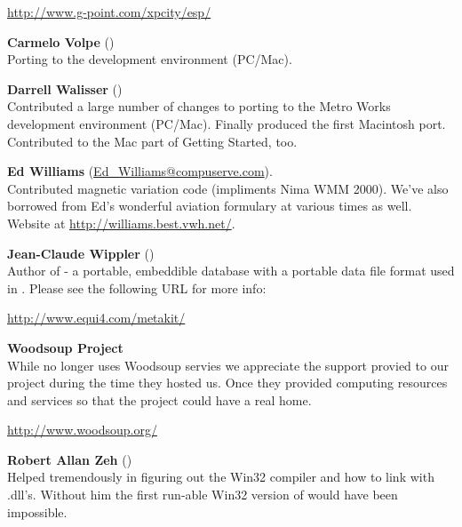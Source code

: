   \href{http://www.g-point.com/xpcity/esp/}{http://www.g-point.com/xpcity/esp/}
\medskip


\noindent \textbf{Carmelo Volpe}
()\\
  Porting \FlightGear{} to the  development environment
  (PC/Mac).
 \medskip

\noindent \textbf{Darrell Walisser}
()\\
 Contributed a large number of changes to porting \FlightGear{} to the Metro Works development environment (PC/Mac). Finally produced the first Macintosh port. Contributed to the Mac part of Getting Started, too.
\medskip

\noindent \textbf{Ed Williams}
(\href{Ed_Williams@compuserve.com}{Ed\_Williams@compuserve.com}).\\
  Contributed magnetic variation code (impliments Nima WMM 2000).
  We've also borrowed from Ed's wonderful aviation formulary at various
  times as well. Website at
  \medskip
  \href{http://williams.best.vwh.net/}{http://williams.best.vwh.net/}.
 \medskip

 \noindent \textbf{Jean-Claude Wippler}
 ()\\
  Author of  - a portable, embeddible database with a portable
  data file format used in \FlightGear{}. Please see the following URL for more info:
 \medskip

  \href{http://www.equi4.com/metakit/}{http://www.equi4.com/metakit/}
  \medskip

\noindent \textbf{Woodsoup Project}\\

  While \FlightGear{} no longer uses Woodsoup servies we appreciate the
  support provied to our project during the time they hosted us. Once they
  provided computing resources and services so that the \FlightGear{} project
  could have a real home.

\href{http://www.woodsoup.org/}{http://www.woodsoup.org/}
  \medskip

\noindent \textbf{Robert Allan Zeh} ()\\
  Helped tremendously in figuring out the  Win32 compiler and
  how to link with .dll's.  Without him the first run-able Win32
  version of \FlightGear{} would have been impossible.

